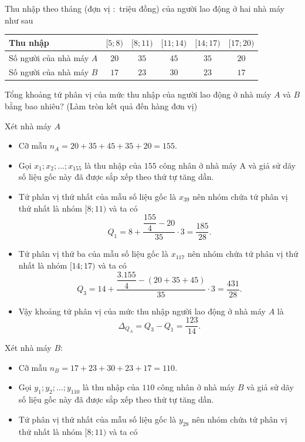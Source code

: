 \begin{ex}%
	Thu nhập theo tháng (đợn vị $\colon$ triệu đồng) của người lao động ở hai nhà máy như sau
	\begin{center}
		\begin{tabular}{|l|c|c|c|c|c|}
			\hline
			Thu nhập & {$[5; 8)$} & {$[8; 11)$} & {$[11; 14)$} & {$[14; 17)$} & {$[17; 20)$} \\
			\hline
			Số người của nhà 
				máy $A$
		& $20$ & $35$ & $45$ & $35$ & $20$ \\
			\hline
		 Số người của nhà 
				máy $B$
		 & $17$ & $23$ & $30$ & $23$ & $17$ \\
			\hline
		\end{tabular}
	\end{center}
	Tổng khoảng tứ phân vị của mức thu nhập của người lao động ở nhà máy $A$ và $B$ bằng bao nhiêu? (Làm tròn kết quả đến hàng đơn vị)
	\loigiai
{
			Xét nhà máy $A$
		\begin{itemize}
			\item 	Cỡ mẫu $n_A=20+35+45+35+20=155$.
				\item Gọi $x_1; x_2; \ldots; x_{155}$ là thu nhập của $155$ công nhân ở nhà máy A và giả sử dãy số liệu gốc này đã được sắp xếp theo thứ tự tăng dần.
			
			\item	Tứ phân vị thứ nhất của mẫu số liệu gốc là $x_{39}$ nên nhóm chứa tứ phân vị thứ nhất là nhóm $[8; 11)$ và ta có
			$$	Q_1=8+\dfrac{\dfrac{155}{4}-20}{35} \cdot 3=\dfrac{185}{28}.
			$$
		\item	Tứ phân vị thứ ba của mẫu số liệu gốc là $x_{117}$ nên nhóm chứa tứ phân vị thứ nhất là nhóm $[14; 17)$ và ta có
		$$
		Q_3=14+\dfrac{\dfrac{3.155}{4}-(20+35+45)}{35} \cdot 3=\dfrac{431}{28}.
		$$
		\item	Vậy khoảng tứ phân vị của mức thu nhập người lao động ở nhà máy $A$ là $$\Delta_{Q_A}=Q_3-Q_1=\dfrac{123}{14}.$$	
		\end{itemize}
	
		Xét nhà máy $B \colon$
		\begin{itemize}
		\item Cỡ mẫu $n_B=17+23+30+23+17=110$.
		\item Gọi $y_1; y_2; \ldots; y_{110}$ là thu nhập của $110$ công nhân ở nhà máy $B$ và giả sử dãy số liệu gốc này đã được sắp xếp theo thứ tự tăng dần.
		\item Tứ phân vị thứ nhất của mẫu số liệu gốc là $y_{28}$ nên nhóm chứa tứ phân vị thứ nhất là nhóm $[8; 11)$ và ta có 
	

\end{itemize}}
\end{ex}
